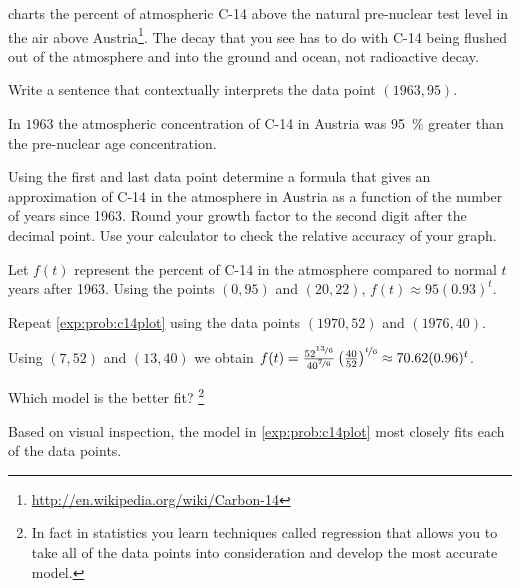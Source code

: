 \begin{problem}[Atmospheric C-14]
 charts the percent of atmospheric C-14 above the natural pre-nuclear test level in the air above Austria\footnote{\href{http://en.wikipedia.org/wiki/Carbon-14}{http://en.wikipedia.org/wiki/Carbon-14}}.  The decay that you see has to do with C-14 being flushed out of the atmosphere and into the ground and ocean, not radioactive decay.
\begin{subproblem}
	Write a sentence that contextually interprets the data point $(1963,95)$.
	\begin{shortsolution}
		In $1963$ the atmospheric concentration of C-14 in Austria was \SI{95}{\percent} greater than
		the pre-nuclear age concentration.
	\end{shortsolution}
\end{subproblem}
\begin{subproblem}\label{exp:prob:c14plot}
	Using the first and last data point determine a formula that gives an approximation of C-14 in the atmosphere in 
	Austria as a function of the number of years since 1963. 
	Round your growth factor to the second digit after the decimal point. 
	Use your calculator to check the relative accuracy of your graph. 
	\begin{shortsolution}
		Let $f(t)$ represent the percent of C-14 in the atmosphere compared to normal $t$ years after 1963. 
		Using the points $(0,95)$ and $(20,22)$, $f(t) \approx 95(0.93)^t$.  
	\end{shortsolution}
\end{subproblem}
\begin{subproblem}
	Repeat \cref{exp:prob:c14plot} using the data points $(1970,52)$ and $(1976,40)$.
	\begin{shortsolution}
		Using $(7,52)$ and $(13,40)$ we obtain $f(t)=\frac{52^{\nicefrac{13}{6}}}{40^{\nicefrac{7}{6}}}\left( \frac{40}{52} \right)^{\nicefrac{t}{6}}\approx 70.62(0.96)^t$.
	\end{shortsolution}
\end{subproblem}
\begin{subproblem}
	Which model is the better fit? \footnote{In fact in statistics you learn techniques called regression that 
	allows you to take all of the data points into consideration and develop the most accurate model.}
	\begin{shortsolution}
		Based on visual inspection, the model in \cref{exp:prob:c14plot} most closely 
		fits each of the data points.
	\end{shortsolution}
\end{subproblem}
\end{problem}
			
